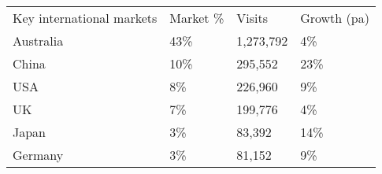 \begin{tabular}[t]{p{3.3cm}>{\hfill}p{1.1cm}>{\hfill}p{1.3cm}>{\hfill}p{1.4cm}}
 Key international markets & Market \% & Visits & Growth (pa) \\ 
 Australia & 43\% & 1,273,792 & 4\% \\ 
  China & 10\% &   295,552 & 23\% \\ 
  USA & 8\% &   226,960 & 9\% \\ 
  UK & 7\% &   199,776 & 4\% \\ 
  Japan & 3\% &    83,392 & 14\% \\ 
  Germany & 3\% &    81,152 & 9\% \\ 
  \end{tabular}
